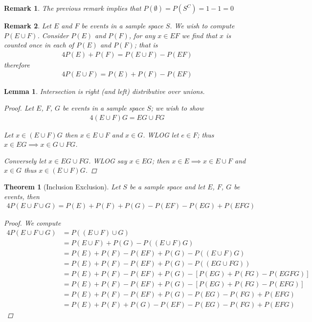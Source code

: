 \documentclass[11pt, oneside]{book}   	%
\newtheorem{remark}{Remark}
\newtheorem{lemma}{Lemma}
\newtheorem{theorem}{Theorem}
\begin{document}
\begin{remark}
	The previous remark implies that $P(\emptyset)=P\left(S^C\right)=1-1=0$
\end{remark}

\begin{remark}
	Let $E$ and $F$ be events in a sample space $S$. We wish to compute $P(E\cup F)$. Consider $P(E)$ and $P(F)$, for any $x\in EF$ we find that $x$ is counted once in each of $P(E)$ and $P(F)$; that is
	\begin{alignat}{4}
		P(E)+P(F)=P(E\cup F)-P(EF)
	\end{alignat}
	therefore 
	\begin{alignat}{4}
		P(E\cup F)=P(E)+P(F)-P(EF)
	\end{alignat}

\end{remark}

\begin{lemma}
	Intersection is right (and left) distributive over unions. 
	\begin{proof}
		Let $E$, $F$, $G$ be events in a sample space $S$; we wish to show
		\begin{alignat}{4}
			(E\cup F)G=EG\cup FG
		\end{alignat}
		
		Let $x\in (E\cup F)G$ then $x\in E\cup F$ and $x\in G$. WLOG let $e\in F$; thus $x\in EG\implies x\in G\cup FG$. 
		
		Conversely let $x\in EG\cup FG$. WLOG say $x\in EG$; then $x\in E\implies x\in E\cup F$ and $x\in G$ thus $x\in (E\cup F)G$. 
	\end{proof}
\end{lemma}

\begin{theorem}[Inclusion Exclusion]
	Let $S$ be a sample space and let $E$, $F$, $G$ be events, then 
	\begin{alignat}{4}
		P(E\cup F\cup G)=P(E)+P(F)+P(G)-P(EF)-P(EG)+P(EFG)
	\end{alignat}
	\begin{proof}
		We compute
		\begin{alignat*}{4}
			P(E\cup F \cup G)&=P((E\cup F)\cup G) \\
				&=P(E\cup F)+P(G)-P((E\cup F)G) \\
				&=P(E)+P(F)-P(EF)+P(G)-P((E\cup F)G) \\
				&=P(E)+P(F)-P(EF)+P(G)-P((EG\cup FG)) \\
				&=P(E)+P(F)-P(EF)+P(G)-\left[P(EG) + P(FG) - P(EGFG)\right] \\
				&=P(E)+P(F)-P(EF)+P(G)-\left[P(EG) + P(FG) - P(EFG)\right] \\
				&=P(E)+P(F)-P(EF)+P(G)-P(EG)-P(FG)+P(EFG) \\
				&=P(E)+P(F)+P(G)-P(EF)-P(EG)-P(FG)+P(EFG)
		\end{alignat*}
	\end{proof}
\end{theorem}
\end{document}

